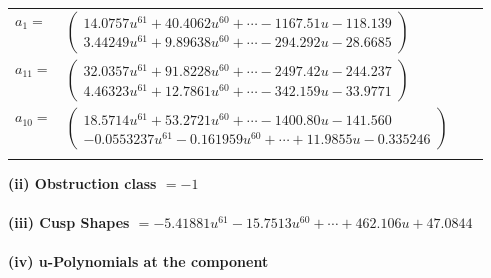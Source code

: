 \documentclass[1p]{elsarticle_modified}
\theoremstyle{definition}
\begin{document}
\begin{tabular}{m{7pt} m{180pt} m{7pt} m{180pt} }
\flushright $a_{1}=$&$\begin{pmatrix}14.0757 u^{61}+40.4062 u^{60}+\cdots-1167.51 u-118.139\\3.44249 u^{61}+9.89638 u^{60}+\cdots-294.292 u-28.6685\end{pmatrix}$ \\
\flushright $a_{11}=$&$\begin{pmatrix}32.0357 u^{61}+91.8228 u^{60}+\cdots-2497.42 u-244.237\\4.46323 u^{61}+12.7861 u^{60}+\cdots-342.159 u-33.9771\end{pmatrix}$ \\
\flushright $a_{10}=$&$\begin{pmatrix}18.5714 u^{61}+53.2721 u^{60}+\cdots-1400.80 u-141.560\\-0.0553237 u^{61}-0.161959 u^{60}+\cdots+11.9855 u-0.335246\end{pmatrix}$\\&\end{tabular}
\flushleft \textbf{(ii) Obstruction class $= -1$}\\~\\
\flushleft \textbf{(iii) Cusp Shapes $= -5.41881 u^{61}-15.7513 u^{60}+\cdots+462.106 u+47.0844$}\\~\\
\newpage\renewcommand{\arraystretch}{1}
\flushleft \textbf{(iv) u-Polynomials at the component}\newline \\
\end{document}
